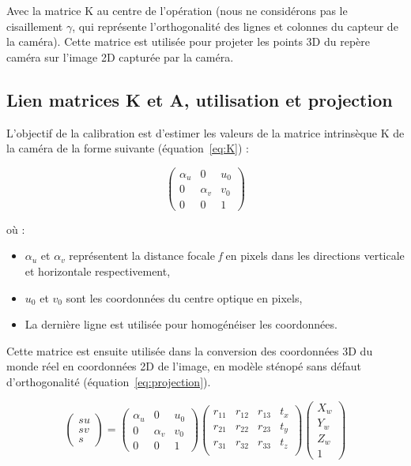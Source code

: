 \documentclass[12pt]{article}
\begin{document}
Avec la matrice K au centre de l'opération (nous ne considérons pas le cisaillement $\gamma$, qui représente l'orthogonalité des lignes et colonnes du capteur de la caméra).
Cette matrice est utilisée pour projeter les points 3D du repère caméra sur l'image 2D capturée par la caméra.

\subsection{Lien matrices K et A, utilisation et projection}

L'objectif de la calibration est d'estimer les valeurs de la matrice intrinsèque K de la caméra de la forme suivante \cite{frenchidrone}\cite{wikipedia_calibration_camera} (équation~\ref{eq:K}) :

\begin{equation}
\begin{pmatrix}
\alpha_{u} & 0 & u_0 \\
0 & \alpha_{v} & v_0 \\
0 & 0 & 1
\end{pmatrix}
\label{eq:K}
\end{equation}

où :
\begin{itemize}
    \item $\alpha_{u}$ et $\alpha_{v}$ représentent la distance focale \textit{f} en pixels dans les directions verticale et horizontale respectivement,
    \item $u_0$ et $v_0$ sont les coordonnées du centre optique en pixels,
    \item La dernière ligne est utilisée pour homogénéiser les coordonnées.
\end{itemize}

Cette matrice est ensuite utilisée dans la conversion des coordonnées 3D du monde réel en coordonnées 2D de l'image, 
en modèle sténopé sans défaut d'orthogonalité (équation~\ref{eq:projection}).

\begin{equation}
\label{eq:projection}
\begin{pmatrix}
su \\
sv \\
s
\end{pmatrix} = 
\begin{pmatrix}
\alpha_{u} & 0 & u_0 \\
0 & \alpha_{v} & v_0 \\
0 & 0 & 1
\end{pmatrix}
\begin{pmatrix}
r_{11} & r_{12} & r_{13} & t_x \\
r_{21} & r_{22} & r_{23} & t_y \\
r_{31} & r_{32} & r_{33} & t_z \\
\end{pmatrix}
\begin{pmatrix}
X_w \\
Y_w \\
Z_w \\
1
\end{pmatrix}
\end{equation}
\end{document}
